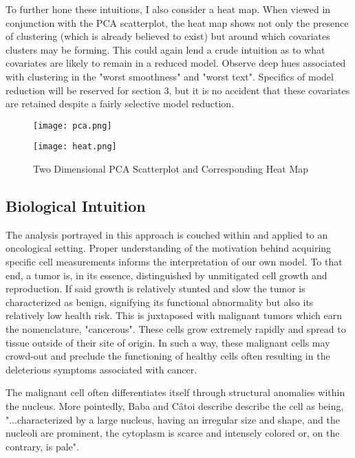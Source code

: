 \documentclass[11pt]{article}
\begin{document}
	To further hone these intuitions, I also consider a heat map.  When viewed in conjunction with the PCA scatterplot, the heat map shows not only the presence of clustering (which is already believed to exist) but around which covariates clusters may be forming.  This could again lend a crude intuition as to what covariates are likely to remain in a reduced model.   Observe deep hues associated with clustering in the "worst smoothness" and "worst text".  Specifics of model reduction will be reserved for section 3, but it is no accident that these covariates are retained despite a fairly selective model reduction.  
	
	
\begin{figure}[htbp]
\centering
\begin{minipage}{.5\textwidth}
	\centering
	\texttt{[image: pca.png]}
\end{minipage}%
\begin{minipage}{.5\textwidth}
	\centering
	\texttt{[image: heat.png]}
\end{minipage}%
\caption{Two Dimensional PCA Scatterplot and Corresponding Heat Map}\label{fig:heat}
\end{figure}

\subsection{Biological Intuition}

	The analysis portrayed in this approach is couched within and applied to an oncological setting.   Proper understanding of the motivation behind acquiring specific cell measurements informs the interpretation of our own model.  To that end, a tumor is, in its essence, distinguished by unmitigated cell growth and reproduction.  If said growth is relatively stunted and slow the tumor is characterized as benign, signifying its functional abnormality but also its relatively low health risk.  This is juxtaposed with malignant tumors which earn the nomenclature, "cancerous".  These cells grow extremely rapidly and spread to tissue outside of their site of origin.  In such a way, these malignant cells may crowd-out and preclude the functioning of healthy cells often resulting in the deleterious symptoms associated with cancer.   
	
	The malignant cell often differentiates itself through structural anomalies within the nucleus.  More pointedly, Baba and  Câtoi describe describe the cell as being, "...characterized by a large nucleus, having an irregular size and shape, and the nucleoli are prominent, the cytoplasm is scarce and intensely colored or, on the contrary, is pale".  
	
\end{document}
